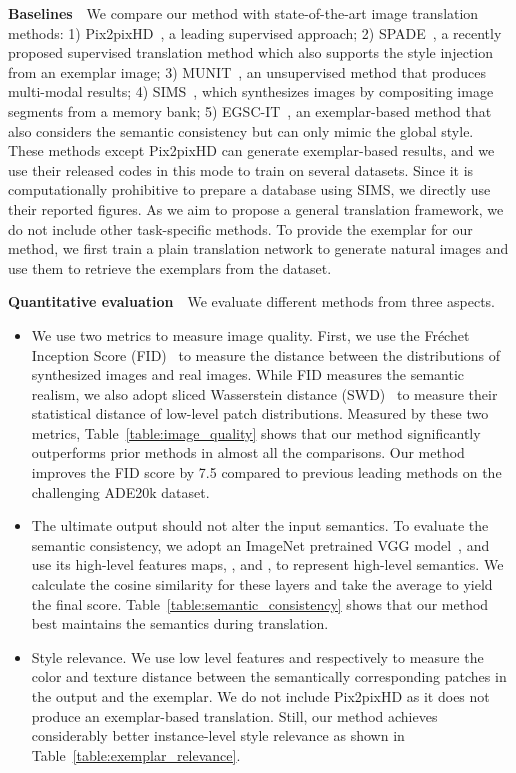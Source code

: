 \documentclass[10pt,twocolumn,letterpaper]{article}
\begin{document}
\noindent\textbf{Baselines}~~We compare our method with state-of-the-art image translation methods: 1) Pix2pixHD~\cite{wang2018high}, a leading supervised approach; 2) SPADE~\cite{park2019semantic}, a recently proposed supervised translation method which also supports the style injection from an exemplar image; 3) MUNIT~\cite{huang2018multimodal}, an unsupervised method that produces multi-modal results; 4) SIMS~\cite{qi2018semi}, which synthesizes images by compositing image segments from a memory bank; 5) EGSC-IT~\cite{ma2018exemplar}, an exemplar-based method that also considers the semantic consistency but can only mimic the global style. These methods except Pix2pixHD can generate exemplar-based results, and we use their released codes in this mode to train on several datasets. Since it is computationally prohibitive to prepare a database using SIMS, we directly use their reported figures. As we aim to propose a general translation framework, we do not include other task-specific methods. To provide the exemplar for our method, we first train a plain translation network to generate natural images and use them to retrieve the exemplars from the dataset. 

\vspace{0.4em}
\noindent\textbf{Quantitative evaluation}~~We evaluate different methods from three aspects. 
\begin{itemize}[leftmargin=*]
    \itemsep0em
    \item We use two metrics to measure image quality. First, we use the Fr\'echet Inception Score (FID)~\cite{heusel2017gans} to measure the distance between the distributions of synthesized images and real images. While FID measures the semantic realism, we also adopt sliced Wasserstein distance (SWD)~\cite{karras2017progressive} to measure their statistical distance of low-level patch distributions. Measured by these two metrics, Table~\ref{table:image_quality} shows that our method significantly outperforms prior methods in almost all the comparisons. Our method improves the FID score by 7.5 compared to previous leading methods on the challenging ADE20k dataset.
    \item The ultimate output should not alter the input semantics. To evaluate the semantic consistency, we adopt an ImageNet pretrained VGG model~\cite{brock2018large}, and use its high-level features maps, ,  and , to represent high-level semantics. We calculate the cosine similarity for these layers and take the average to yield the final score. Table~\ref{table:semantic_consistency} shows that our method best maintains the semantics during translation.
    \item Style relevance. We use low level features  and  respectively to measure the color and texture distance between the semantically corresponding patches in the output and the exemplar. We do not include Pix2pixHD as it does not produce an exemplar-based translation. Still, our method achieves considerably better instance-level style relevance as shown in Table~\ref{table:exemplar_relevance}.
\end{itemize}
\end{document}
